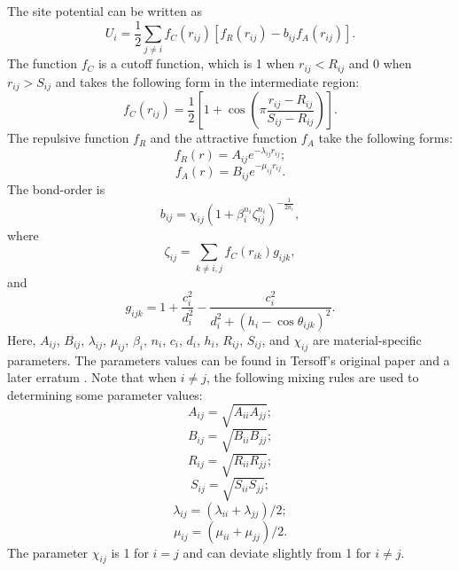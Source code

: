 \documentclass[12pt,a4paper]{report}
\begin{document}
The site potential can be written as
\begin{equation}
U_i =  \frac{1}{2} \sum_{j \neq i} f_C(r_{ij}) \left[ f_R(r_{ij}) - b_{ij} f_A(r_{ij}) \right].
\end{equation}
The function $f_{C}$ is a cutoff function, which is 1 when $r_{ij}<R_{ij}$ and 0 when  $r_{ij}>S_{ij}$ and takes the following form in the intermediate region:
\begin{equation}
f_{C}(r_{ij}) = \frac{1}{2}
\left[
1 + \cos \left( \pi \frac{r_{ij} - R_{ij}}{S_{ij} - R_{ij}} \right)
\right].
\end{equation}
The repulsive function $f_{R}$ and the attractive function $f_{A}$ take the following forms:
\begin{equation}
f_{R}(r) = A_{ij} e^{-\lambda_{ij} r_{ij}};
\end{equation}
\begin{equation}
f_{A}(r) = B_{ij} e^{-\mu_{ij} r_{ij}}.
\end{equation}
The bond-order is
\begin{equation}
\label{equation:bij}
b_{ij} = \chi_{ij} \left(1 + \beta_i^{n_i} \zeta^{n_i}_{ij}\right)^{-\frac{1}{2n_i}},
\end{equation}
where
\begin{equation}
\zeta_{ij} = \sum_{k\neq i, j}f_C(r_{ik}) g_{ijk},
\end{equation}
and
\begin{equation}
g_{ijk} = 1 + \frac{c_i^2}{d_i^2} - \frac{c_i^2}{d_i^2+(h_i-\cos\theta_{ijk})^2}.
\end{equation}
Here, $A_{ij}$, $B_{ij}$, $\lambda_{ij}$, $\mu_{ij}$, $\beta_i$, $n_i$, $c_i$, $d_i$, $h_i$, $R_{ij}$, $S_{ij}$, and $\chi_{ij}$ are material-specific parameters. The parameters values can be found in Tersoff's original paper \cite{tersoff1989prb} and a later erratum \cite{tersoff1990prb}. Note that when $i \neq j$, the following mixing rules are used to determining some parameter values:
\begin{equation}
A_{ij} =  \sqrt{A_{ii} A_{jj}};
\end{equation}
\begin{equation}
B_{ij} =  \sqrt{B_{ii} B_{jj}};
\end{equation}
\begin{equation}
R_{ij} =  \sqrt{R_{ii} R_{jj}};
\end{equation}
\begin{equation}
S_{ij} =  \sqrt{S_{ii} S_{jj}};
\end{equation}
\begin{equation}
\lambda_{ij} =  (\lambda_{ii} + \lambda_{jj})/2;
\end{equation}
\begin{equation}
\mu_{ij} =  (\mu_{ii} + \mu_{jj})/2.
\end{equation}
The parameter $\chi_{ij}$ is 1 for $i=j$ and can deviate slightly from 1 for $i \neq j$.
\end{document}
